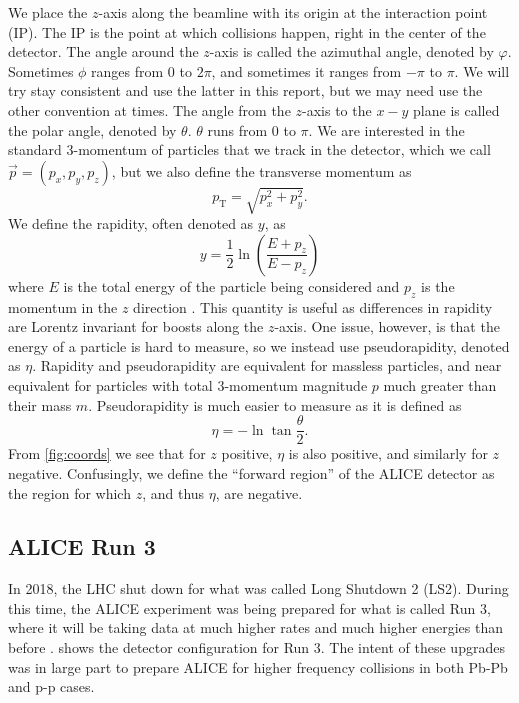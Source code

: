 \documentclass[11pt]{article}
\numberwithin{equation}{section}
\numberwithin{figure}{section}
\numberwithin{table}{section}
\begin{document}
We place the $z$-axis along the beamline with its origin at the interaction point (IP). The IP is the point at which collisions happen, right in the center of the detector. The angle around the $z$-axis is called the azimuthal angle, denoted by $\varphi$. Sometimes $\phi$ ranges from 0 to $2\pi$, and sometimes it ranges from $-\pi$ to $\pi$. We will try stay consistent and use the latter in this report, but we may need use the other convention at times. The angle from the $z$-axis to the $x-y$ plane is called the polar angle, denoted by $\theta$. $\theta$ runs from 0 to $\pi$. We are interested in the standard 3-momentum of particles that we track in the detector, which we call $\vec{p}=(p_x,p_y,p_z)$, but we also define the transverse momentum as 
\begin{equation}
    p_{\mathrm{T}}=\sqrt{p_x^2 + p_y^2}.
    \label{eqn:transverse momentum}
\end{equation}
We define the rapidity, often denoted as $y$, as
\begin{equation}
    y=\frac 12 \ln\left(\frac{E+p_z}{E-p_z}\right)
    \label{eqn:rapidity}
\end{equation}
where $E$ is the total energy of the particle being considered and $p_z$ is the momentum in the $z$ direction \cite{kar_exp_phys}. This quantity is useful as differences in rapidity are Lorentz invariant for boosts along the $z$-axis. One issue, however, is that the energy of a particle is hard to measure, so we instead use pseudorapidity, denoted as $\eta$. Rapidity and pseudorapidity are equivalent for massless particles, and near equivalent for particles with total 3-momentum magnitude $p$ much greater than their mass $m$. Pseudorapidity is much easier to measure as it is defined as \cite{kar_exp_phys}
\begin{equation}
    \eta=-\ln\tan\frac{\theta}{2}.
    \label{eqn:pseudorapidity}
\end{equation}
From \cref{fig:coords} we see that for $z$ positive, $\eta$ is also positive, and similarly for $z$ negative. Confusingly, we define the ``forward region'' of the ALICE detector as the region for which $z$, and thus $\eta$, are negative. 

\subsection{ALICE Run 3}
In 2018, the LHC shut down for what was called Long Shutdown 2 (LS2). During this time, the ALICE experiment was being prepared for what is called Run 3, where it will be taking data at much higher rates and much higher energies than before \cite{ALICE_Upgrade_LOI}.  shows the detector configuration for Run 3. The intent of these upgrades was in large part to prepare ALICE for higher frequency collisions in both Pb-Pb and p-p cases. 
\end{document}

